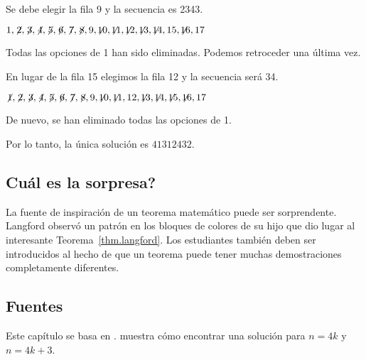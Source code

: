 \noindent Se debe elegir la fila 9 y la secuencia es 2{}34{}3.

$1,\not\! 2,\not\! 3,\not\! 4,\not\! 5,\not\! 6,\not\! 7,\not\! 8,9,\not\!\! 10,\not\!\! 11,\not\!\! 12,\not\!\! 13,\not\!\! 14,15,\not\!\! 16,17$

\noindent Todas las opciones de 1 han sido eliminadas. Podemos retroceder una última vez. 

\smallskip

\noindent En lugar de la fila 15 elegimos la fila 12 y la secuencia será 3{}4\textvisiblespace {}.

$\not\! 1,\not\! 2,\not\! 3,\not\! 4,\not\! 5,\not\! 6,\not\! 7,\not\! 8,9,\not\!\! 10,\not\!\! 11,12,\not\!\! 13,\not\!\! 14,\not\!\! 15,\not\!\! 16,17$

\noindent De nuevo, se han eliminado todas las opciones de 1.

\medskip

\noindent Por lo tanto, la única solución es $41312432$.

\subsection*{Cuál es la sorpresa?}

La fuente de inspiración de un teorema matemático puede ser sorprendente. Langford observó un patrón en los bloques de colores de su hijo que dio lugar al interesante Teorema~\ref{thm.langford}. Los estudiantes también deben ser introducidos al hecho de que un teorema puede tener muchas demostraciones completamente diferentes.

\subsection*{Fuentes}
Este capítulo se basa en \cite{miller}. \cite{davies} muestra cómo encontrar una solución para $n=4k$ y $n=4k+3$.
